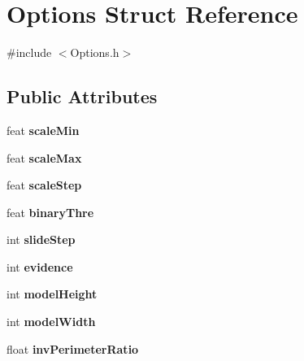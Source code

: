 \hypertarget{structOptions}{}\section{Options Struct Reference}
\label{structOptions}


{\ttfamily \#include $<$Options.\+h$>$}

\subsection*{Public Attributes}
\begin{DoxyCompactItemize}
\item 
\hypertarget{structOptions_affdfe3fdb610773968554bc1a80176dd}{}feat {\bfseries scale\+Min}\label{structOptions_affdfe3fdb610773968554bc1a80176dd}

\item 
\hypertarget{structOptions_a0652a70e49763e95db9f61f2f70f7bf7}{}feat {\bfseries scale\+Max}\label{structOptions_a0652a70e49763e95db9f61f2f70f7bf7}

\item 
\hypertarget{structOptions_adb2992a2cc6928303de986d7a1052a00}{}feat {\bfseries scale\+Step}\label{structOptions_adb2992a2cc6928303de986d7a1052a00}

\item 
\hypertarget{structOptions_aa7e47c7146ac77408d3ab3a8028185fd}{}feat {\bfseries binary\+Thre}\label{structOptions_aa7e47c7146ac77408d3ab3a8028185fd}

\item 
\hypertarget{structOptions_a802f1830b28814d67ba43b69e2549910}{}int {\bfseries slide\+Step}\label{structOptions_a802f1830b28814d67ba43b69e2549910}

\item 
\hypertarget{structOptions_a96a28ee7a8e6655bce8cdf47f0d3f64a}{}int {\bfseries evidence}\label{structOptions_a96a28ee7a8e6655bce8cdf47f0d3f64a}

\item 
\hypertarget{structOptions_a28c5d1648f5bf5c9e9461a59262a6e13}{}int {\bfseries model\+Height}\label{structOptions_a28c5d1648f5bf5c9e9461a59262a6e13}

\item 
\hypertarget{structOptions_a06b085d0c70d1e423b85b7e9db5fd9fc}{}int {\bfseries model\+Width}\label{structOptions_a06b085d0c70d1e423b85b7e9db5fd9fc}

\item 
\hypertarget{structOptions_ae412ce0aa974ad8ce47b65d1ec581317}{}float {\bfseries inv\+Perimeter\+Ratio}\label{structOptions_ae412ce0aa974ad8ce47b65d1ec581317}


\end{DoxyCompactItemize}
